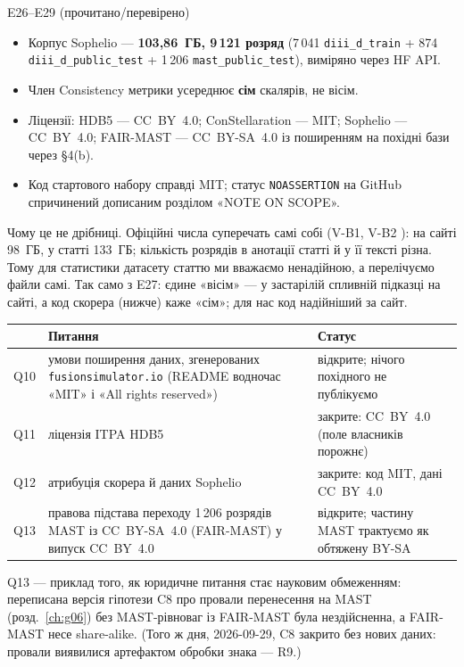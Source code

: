 \begin{established}{E26--E29 (прочитано/перевірено)}
\begin{itemize}
\item[E26] Корпус Sophelio --- \textbf{103,86~ГБ, 9\,121 розряд} (7\,041 \texttt{diii\_d\_train}
  + 874 \texttt{diii\_d\_public\_test} + 1\,206 \texttt{mast\_public\_test}), виміряно
  через HF API.
\item[E27] Член Consistency метрики усереднює \textbf{сім} скалярів, не вісім.
\item[E28] Ліцензії: HDB5 --- CC~BY~4.0; ConStellaration --- MIT; Sophelio --- CC~BY~4.0;
  FAIR-MAST --- CC~BY-SA~4.0 із поширенням на похідні бази через §4(b).
\item[E29] Код стартового набору справді MIT; статус \texttt{NOASSERTION} на GitHub
  спричинений дописаним розділом «NOTE ON SCOPE».
\end{itemize}
\end{established}

Чому це не дрібниці. Офіційні числа суперечать самі собі (V-B1, V-B2 \cite{RegVerif}):
на сайті 98~ГБ, у статті 133~ГБ; кількість розрядів в анотації статті й у її тексті
різна. Тому для статистики датасету статтю \cite{FEC} ми вважаємо ненадійною, а
перелічуємо файли самі. Так само з E27: єдине «вісім» --- у застарілій спливній підказці на
сайті, а код скорера (нижче) каже «сім»; для нас код надійніший за сайт.

\begin{center}\small
\begin{tabularx}{\textwidth}{@{}p{0.8cm}Xp{3.3cm}@{}}
\toprule
& Питання & Статус \\
\midrule
Q10 & умови поширення даних, згенерованих \texttt{fusionsimulator.io} (README водночас
  «MIT» і «All rights reserved») & відкрите; нічого похідного не публікуємо \\
Q11 & ліцензія ITPA HDB5 & закрите: CC~BY~4.0 (поле власників порожнє) \\
Q12 & атрибуція скорера й даних Sophelio & закрите: код MIT, дані CC~BY~4.0 \\
Q13 & правова підстава переходу 1\,206 розрядів MAST із CC~BY-SA~4.0 (FAIR-MAST) у випуск
  CC~BY~4.0 & відкрите; частину MAST трактуємо як обтяжену BY-SA \\
\bottomrule
\end{tabularx}
\end{center}

Q13 --- приклад того, як юридичне питання стає науковим обмеженням: переписана версія
гіпотези C8 про провали перенесення на MAST (розд.~\ref{ch:g06}) без MAST-рівноваг із
FAIR-MAST була нездійсненна, а FAIR-MAST несе share-alike. (Того ж дня, 2026-09-29, C8
закрито без нових даних: провали виявилися артефактом обробки знака --- R9.)

